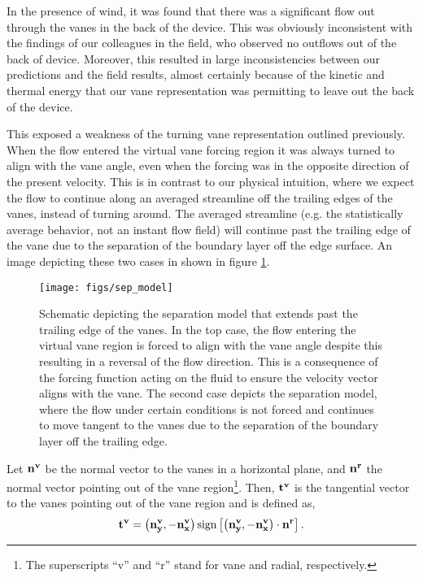 In the presence of wind, it was found that there was a significant flow
out through the vanes in the back of the device. This was obviously
inconsistent with the findings of our colleagues in the field, who
observed no outflows out of the back of device. Moreover, this resulted
in large inconsistencies between our predictions and the field results,
almost certainly because of the kinetic and thermal energy that our vane
representation was permitting to leave out the back of the device.  

This exposed a weakness of the turning vane representation outlined
previously. When the flow entered the virtual vane forcing region it was
always turned to align with the vane angle, even when the forcing was in
the opposite direction of the present velocity.
This is in contrast to our physical intuition, where we
expect the flow to continue along an averaged streamline
off the trailing edges of the vanes, instead of turning around. 
The averaged streamline (e.g. the statistically average behavior, not
an instant flow field) will continue past the trailing edge of the vane
due to the separation of the boundary layer off the edge surface. An
image depicting these two cases in shown in figure \ref{fig:sep_model}.  

\begin{figure}[!htb]
  \begin{center}
    \texttt{[image: figs/sep\_model]}
    \caption{Schematic depicting the separation model that extends past
   the trailing edge of the vanes. In the top case, the flow entering
   the virtual vane region is forced to align with the vane angle despite
   this resulting in a reversal of the flow direction. This is a
   consequence of the forcing function acting on the fluid to ensure the
   velocity vector aligns with the vane. 
   The second case depicts the separation
   model, where the flow under certain conditions is not forced and
   continues to move tangent to the vanes due to 
   the separation of the boundary layer off the trailing edge.} 
    \label{fig:sep_model}
  \end{center}
\end{figure}

Let $\bf n^v$ be the normal vector to the vanes in a horizontal plane,
and $\bf n^r$ the normal vector pointing out of the vane
region\footnote{\normalsize The superscripts ``v'' and ``r'' stand for
vane and radial, respectively.}.  
Then, $\bf t^v$ is the tangential vector to the vanes pointing out of
the vane region and is defined as,
\begin{equation}
 \bf t^v = \left( {\bf n^v_y},{\bf -n_x^v} \right) \text{sign}\left[
	    \left( {\bf n^v_y},{\bf -n_x^v} \right) \cdot {\bf n^r} \right].
\end{equation}


